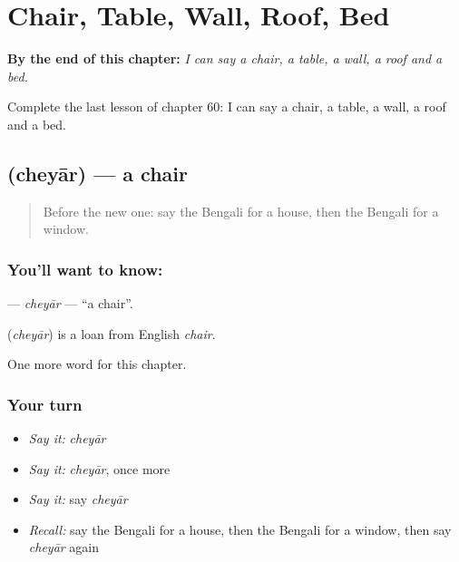 
\chapter{Chair, Table, Wall, Roof, Bed}
\label{ch:bn-chair-table-wall-roof-bed}

\begin{chapteropening}
\textbf{By the end of this chapter:} \emph{I can say a chair, a table, a wall, a roof and a bed.}

Complete the last lesson of chapter 60: I can say a chair, a table, a wall, a roof and a bed.
\end{chapteropening}

\section[\texorpdfstring{\bn{চেয়ার} (cheyār)}{চেয়ার (cheyār)}]{ (cheyār) — a chair}

\label{lesson:BN-C60-cheyar}



\begin{quote}
Before the new one: say the Bengali for a house, then the Bengali for a window.
\end{quote}

\subsection*{You'll want to know: }
\textbf{} — \emph{cheyār} — \textquotedblleft{}a chair\textquotedblright{}.

\begin{cousinweb}
\textbf{} (\emph{cheyār}) is a loan from English \emph{chair}.
\end{cousinweb}

\begin{grammarlens}[title={What you've built}]
One more word for this chapter.
\end{grammarlens}

\subsection*{Your turn}
\begin{itemize}
\raggedright
  \item \emph{Say it:} \emph{cheyār}
  \item \emph{Say it:} \emph{cheyār}, once more
  \item \emph{Say it:} say \emph{cheyār}
  \item \emph{Recall:} say the Bengali for a house, then the Bengali for a window, then say \emph{cheyār} again
\end{itemize}

